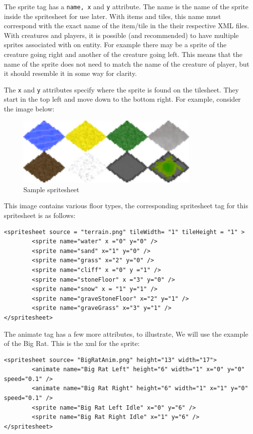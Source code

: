 \documentclass{book}
\begin{document}
The sprite tag has a \texttt{name, x} and \texttt{y} attribute. The name is the name of the sprite inside the spritesheet for use later. With items and tiles, this name must correspond with the exact name of the item/tile in the their respective XML files. With creatures and players, it is possible (and recommended) to have multiple sprites associated with on entity. For example there may be a sprite of the creature going right and another of the creature going left. This means that the name of the sprite does not need to match the name of the creature of player, but it should resemble it in some way for clarity.

The \texttt{x} and \texttt{y} attributes specify where the sprite is found on the tilesheet. They start in the top left and move down to the bottom right. For example, consider the image below:

\begin{figure}[ht!]
		\centering
		\includegraphics[width=90mm]{terrain.png}
		\caption{Sample spritesheet}
\end{figure}

This image contains various floor types, the corresponding spritesheet tag for this spritesheet is as follows:

\begin{verbatim}
<spritesheet source = "terrain.png" tileWidth= "1" tileHeight = "1" >
		<sprite name="water" x ="0" y="0" />
		<sprite name="sand" x="1" y="0" />
		<sprite name="grass" x="2" y="0" />
		<sprite name="cliff" x ="0" y ="1" />
		<sprite name="stoneFloor" x ="3" y="0" />
		<sprite name="snow" x = "1" y="1" />
		<sprite name="graveStoneFloor" x="2" y="1" />
		<sprite name="graveGrass" x="3" y="1" />
</spritesheet>
\end{verbatim}

The animate tag has a few more attributes, to illustrate, We will use the example of the Big Rat. This is the xml for the sprite:
\begin{verbatim}
<spritesheet source= "BigRatAnim.png" height="13" width="17">
		<animate name="Big Rat Left" height="6" width="1" x="0" y="0" speed="0.1" />
		<animate name="Big Rat Right" height="6" width="1" x="1" y="0" speed="0.1" />
		<sprite name="Big Rat Left Idle" x="0" y="6" />
		<sprite name="Big Rat Right Idle" x="1" y="6" />
</spritesheet>
\end{verbatim}
\end{document}
